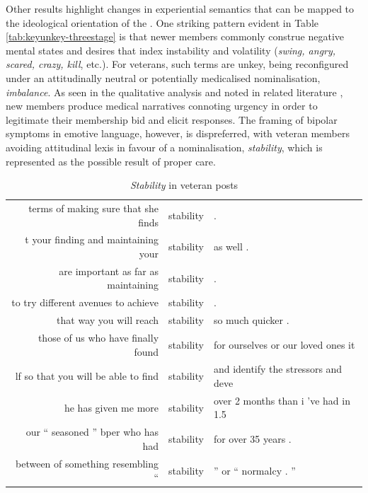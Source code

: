 Other results highlight changes in experiential semantics that can be mapped to the ideological orientation of the . One striking pattern evident in Table \ref{tab:keyunkey-threestage} is that newer \glspl{member} commonly construe negative mental states and desires that index instability and volatility (\emph{swing, angry, scared, crazy, kill}, etc.). For veterans, such terms are unkey, being reconfigured under an attitudinally neutral or potentially medicalised nominalisation, \emph{imbalance}. As seen in the qualitative analysis and noted in related literature \cite[e.g.][]{horne_doing_2009}, new \glspl{member} produce medical narratives connoting urgency in order to legitimate their membership bid and elicit responses. The framing of bipolar symptoms in emotive language, however, is dispreferred, with veteran \glspl{member} avoiding attitudinal lexis in favour of a nominalisation, \emph{stability}, which is represented as the possible result of proper care.

\begin{table}[htb]
\centering
\begin{tabular}{rll}
\toprule
terms of making sure that she finds &  stability   &  .                                   \\
t your finding and maintaining your &  stability   &  as well .                           \\
are important as far as maintaining &  stability   &  .                                   \\
to try different avenues to achieve &  stability   &  .                                   \\
            that way you will reach &  stability   &  so much quicker .                   \\
 those of us who have finally found &  stability   &  for ourselves or our loved ones it  \\
lf so that you will be able to find &  stability   &  and identify the stressors and deve \\
               he has given me more &  stability   &  over 2 months than i 've had in 1.5 \\
our `` seasoned '' bper who has had &  stability   &  for over 35 years .                 \\
 between of something resembling `` &  stability   &  '' or `` normalcy . ''              \\

\bottomrule
\end{tabular}
\caption{\emph{Stability} in veteran posts}
\label{conc:stability}
\end{table}


